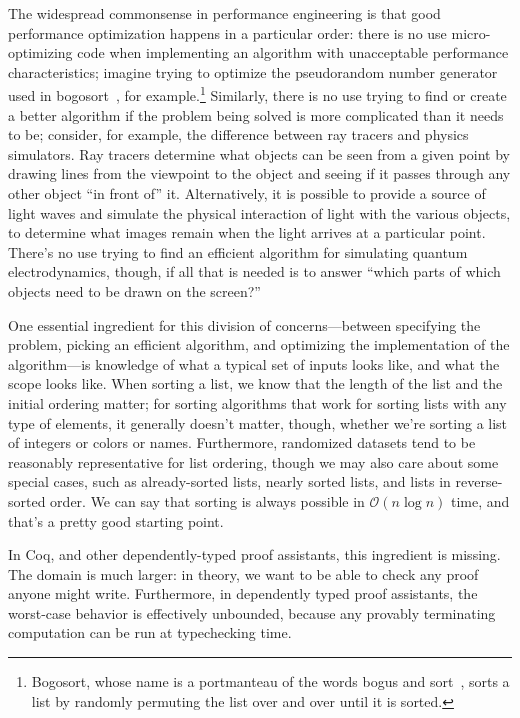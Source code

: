 The widespread commonsense in performance engineering %
is that good performance optimization happens in a particular order:
there is no use micro-optimizing code when implementing an algorithm with unacceptable performance characteristics; imagine trying to optimize the pseudorandom number generator used in bogosort~\cite{Sorting2007Gruber}, for example.\footnote{Bogosort, whose name is a portmanteau of the words bogus and sort~\cite{bogosort-name}, sorts a list by randomly permuting the list over and over until it is sorted.}
Similarly, there is no use trying to find or create a better algorithm if the problem being solved is more complicated than it needs to be; consider, for example, the difference between ray tracers and physics simulators.
Ray tracers determine what objects can be seen from a given point by drawing lines from the viewpoint to the object and seeing if it passes through any other object ``in front of'' it.
Alternatively, it is possible to provide a source of light waves and simulate the physical interaction of light with the various objects, to determine what images remain when the light arrives at a particular point.
There's no use trying to find an efficient algorithm for simulating quantum electrodynamics, though, if all that is needed is to answer ``which parts of which objects need to be drawn on the screen?''

One essential ingredient for this division of concerns---between specifying the problem, picking an efficient algorithm, and optimizing the implementation of the algorithm---is knowledge of what a typical set of inputs looks like, and what the scope looks like.
When sorting a list, we know that the length of the list and the initial ordering matter; for sorting algorithms that work for sorting lists with any type of elements, it generally doesn't matter, though, whether we're sorting a list of integers or colors or names.
Furthermore, randomized datasets tend to be reasonably representative for list ordering, though we may also care about some special cases, such as already-sorted lists, nearly sorted lists, and lists in reverse-sorted order.
We can say that sorting is always possible in $\mathcal O(n\log n)$ time, and that's a pretty good starting point.

In Coq, and other dependently-typed proof assistants, this ingredient is missing.
The domain is much larger: in theory, we want to be able to check any proof anyone might write.
Furthermore, in dependently typed proof assistants, the worst-case behavior is effectively unbounded, because any provably terminating computation can be run at typechecking time.

